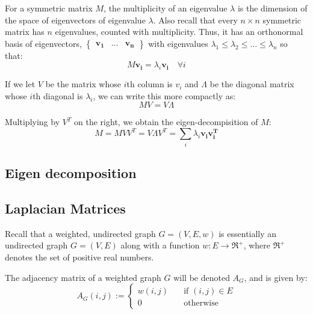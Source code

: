 For a symmetric matrix $M$, the multiplicity of an eigenvalue $\lambda$ is the
dimension of the space of eigenvectors of eigenvalue $\lambda$. Also recall that
every $n{\times}n$ symmetric matrix has $n$ eigenvalues, counted with 
multiplicity. Thus, it has an orthonormal basis of eigenvectors, 
$\begin{Bmatrix} \mathbf{v_{1}} & \ldots & \mathbf{v_{n}} \end{Bmatrix}$ with
eigenvalues $\lambda_{1} \leq \lambda_{2} \leq \ldots \leq \lambda_{n}$ so that:
\begin{displaymath}
M\mathbf{v_{i}} = \lambda_{i}\mathbf{v_{i}} \quad \forall i
\end{displaymath}

If we let $V$ be the matrix whose $i$th column is $v_{i}$ and $\Lambda$ be the 
diagonal matrix whose $i$th diagonal is $\lambda_{i}$, we can write this more 
compactly as:
\begin{displaymath}
MV = V\Lambda
\end{displaymath}

Multiplying by $V^{T}$ on the right, we obtain the eigen-decompisition of $M$:
\begin{displaymath}
M = MVV^{T} = V{\Lambda}V^{T} = \sum_{i} \lambda_{i}\mathbf{v_{i}}\mathbf{v_{i}^{T}}
\end{displaymath}

\subsection{Eigen decomposition}
\label{sec:eigenDecomposition}

\subsection{Laplacian Matrices}
\label{sec:laplacianMatrices}
\nocite{Berkeley:1999}
\nocite{Pati:2011}
\nocite{Spielman:2006}
Recall that a weighted, undirected graph $G = (V,E,w)$ is essentially an 
undirected graph $G = (V,E)$ along with a function $w : E \rightarrow 
\Re^{+}$, where $\Re^{+}$ denotes the set of positive real numbers.

The adjacency matrix of a weighted graph $G$ will be denoted $A_{G}$, and is
given by:
\begin{displaymath}
A_{G}(i,j) := 
    \left\{
        \begin{array}{ll}
            \mathit{w}(i,j) &   \quad \text{if $(i,j) \in E$} \\
            0 &                 \quad \text{otherwise}
        \end{array}
    \right.
\end{displaymath}

